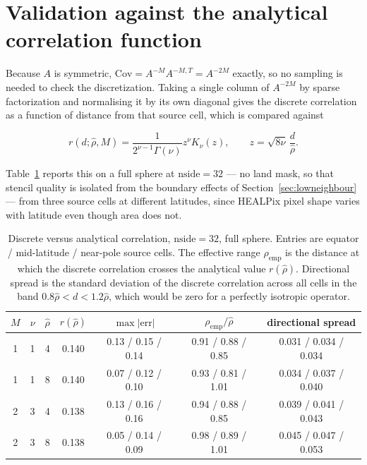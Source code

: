 \documentclass[11pt]{article}
\newcommand{\rhohat}{\hat{\rho}}
\begin{document}
\section{Validation against the analytical correlation function}
\label{sec:validation}

Because $A$ is symmetric, $\mathrm{Cov} = A^{-M}A^{-M,T} = A^{-2M}$ exactly, so no
sampling is needed to check the discretization. Taking a single column of $A^{-2M}$ by
sparse factorization and normalising it by its own diagonal gives the discrete
correlation as a function of distance from that source cell, which is compared against

\begin{equation}
\label{eq:matern}
r(d;\rhohat,M) = \frac{1}{2^{\nu-1}\Gamma(\nu)} z^{\nu} K_\nu(z),
\qquad
z = \sqrt{8\nu}\,\frac{d}{\rhohat}.
\end{equation}

Table~\ref{tab:validation} reports this on a full sphere at $\mathrm{nside}=32$ --- no
land mask, so that stencil quality is isolated from the boundary effects of
Section~\ref{sec:lowneighbour} --- from three source cells at different latitudes, since
HEALPix pixel shape varies with latitude even though area does not.

\begin{table}[htbp]
\centering
\caption{Discrete versus analytical correlation, $\mathrm{nside}=32$, full sphere. Entries
are equator / mid-latitude / near-pole source cells. The effective range
$\rho_{\text{emp}}$ is the distance at which the discrete correlation crosses the
analytical value $r(\rhohat)$. Directional spread is the standard deviation of the
discrete correlation across all cells in the band $0.8\rhohat < d < 1.2\rhohat$, which
would be zero for a perfectly isotropic operator.}
\label{tab:validation}
\begin{tabular}{ccccccc}
\toprule
$M$ & $\nu$ & $\rhohat$ & $r(\rhohat)$ & $\max|\text{err}|$ & $\rho_{\text{emp}}/\rhohat$ & directional spread \\
\midrule
1 & 1 & 4 & 0.140 & 0.13 / 0.15 / 0.14 & 0.91 / 0.88 / 0.85 & 0.031 / 0.034 / 0.034 \\
1 & 1 & 8 & 0.140 & 0.07 / 0.12 / 0.10 & 0.93 / 0.81 / 1.01 & 0.034 / 0.037 / 0.040 \\
2 & 3 & 4 & 0.138 & 0.13 / 0.16 / 0.16 & 0.94 / 0.88 / 0.85 & 0.039 / 0.041 / 0.043 \\
2 & 3 & 8 & 0.138 & 0.05 / 0.14 / 0.09 & 0.98 / 0.89 / 1.01 & 0.045 / 0.047 / 0.053 \\
\bottomrule
\end{tabular}
\end{table}
\end{document}
